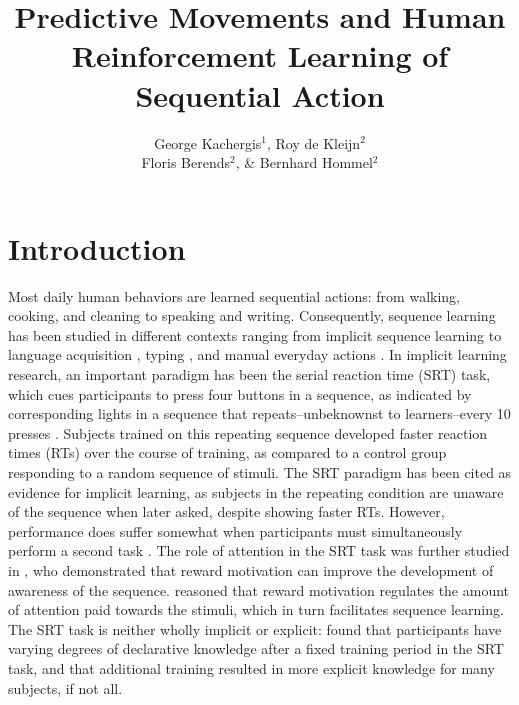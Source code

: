 \documentclass[man,floatsintext]{apa6}
\title{Predictive Movements and Human Reinforcement Learning of Sequential Action}
\author{
 George Kachergis$^{1}$, Roy de Kleijn$^{2}$ \\
 Floris Berends$^{2}$, \& Bernhard Hommel$^{2}$
}
\affiliation{
$^{1}$ Psychology Department \\
  New York University \\
$^{2}$Institute of Psychology / LIBC, Leiden University \\
  Leiden, the Netherlands
}
\begin{document}
\maketitle

\section{Introduction} 

Most daily human behaviors are learned sequential actions: from walking, cooking, and cleaning to speaking and writing. Consequently, sequence learning has been studied in different contexts ranging from implicit sequence learning \cite{Nissen:1987,Cleeremans:1991,Stadler:1992,Boyer:2005} to language acquisition \cite{Elman:1990,Saffran:1996}, typing \cite{Fendrick:1937,Gentner:1988}, and manual everyday actions \cite{Cooper:2000,Botvinick:2004}. In implicit learning research, an important paradigm has been the serial reaction time (SRT) task, which cues participants to press four buttons in a sequence, as indicated by corresponding lights in a sequence that repeats--unbeknownst to learners--every 10 presses \cite{Nissen:1987}. Subjects trained on this repeating sequence developed faster reaction times (RTs) over the course of training, as compared to a control group responding to a random sequence of stimuli. The SRT paradigm has been cited as evidence for implicit learning, as subjects in the repeating condition are unaware of the sequence when later asked, despite showing faster RTs. However, performance does suffer somewhat when participants must simultaneously perform a second task \cite{Nissen:1987}. The role of attention in the SRT task was further studied in , who demonstrated that reward motivation can improve the development of awareness of the sequence.  reasoned that reward motivation regulates the amount of attention paid towards the stimuli, which in turn facilitates sequence learning. The SRT task is neither wholly implicit or explicit:  found that participants have varying degrees of declarative knowledge after a fixed training period in the SRT task, and that additional training resulted in more explicit knowledge for many subjects, if not all. 
\end{document}
